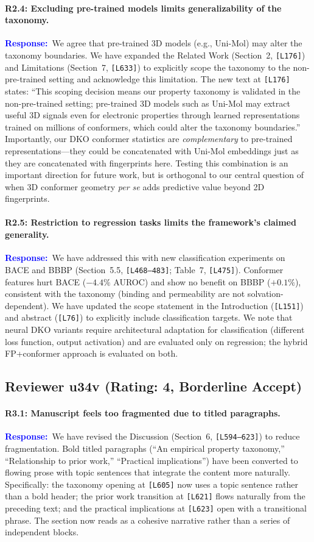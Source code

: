 \documentclass[11pt]{article}
\newcommand{\reviewer}[1]{\subsection*{#1}}
\newcommand{\point}[1]{\paragraph{#1}}
\newcommand{\response}{\textcolor{blue}{\textbf{Response:}}~}
\newcommand{\lines}[1]{\texttt{[L#1]}}
\begin{document}
\point{R2.4: Excluding pre-trained models limits generalizability of the taxonomy.}

\response We agree that pre-trained 3D models (e.g., Uni-Mol) may alter the taxonomy boundaries. We have expanded the Related Work (Section~2, \lines{176}) and Limitations (Section~7, \lines{633}) to explicitly scope the taxonomy to the non-pre-trained setting and acknowledge this limitation. The new text at \lines{176} states: ``This scoping decision means our property taxonomy is validated in the non-pre-trained setting; pre-trained 3D models such as Uni-Mol may extract useful 3D signals even for electronic properties through learned representations trained on millions of conformers, which could alter the taxonomy boundaries.'' Importantly, our DKO conformer statistics are \emph{complementary} to pre-trained representations---they could be concatenated with Uni-Mol embeddings just as they are concatenated with fingerprints here. Testing this combination is an important direction for future work, but is orthogonal to our central question of when 3D conformer geometry \emph{per se} adds predictive value beyond 2D fingerprints.

\point{R2.5: Restriction to regression tasks limits the framework's claimed generality.}

\response We have addressed this with new classification experiments on BACE and BBBP (Section~5.5, \lines{468--483}; Table~7, \lines{475}). Conformer features hurt BACE ($-4.4\%$ AUROC) and show no benefit on BBBP ($+0.1\%$), consistent with the taxonomy (binding and permeability are not solvation-dependent). We have updated the scope statement in the Introduction (\lines{151}) and abstract (\lines{76}) to explicitly include classification targets. We note that neural DKO variants require architectural adaptation for classification (different loss function, output activation) and are evaluated only on regression; the hybrid FP+conformer approach is evaluated on both.

\reviewer{Reviewer u34v (Rating: 4, Borderline Accept)}

\point{R3.1: Manuscript feels too fragmented due to titled paragraphs.}

\response We have revised the Discussion (Section~6, \lines{594--623}) to reduce fragmentation. Bold titled paragraphs (``An empirical property taxonomy,'' ``Relationship to prior work,'' ``Practical implications'') have been converted to flowing prose with topic sentences that integrate the content more naturally. Specifically: the taxonomy opening at \lines{605} now uses a topic sentence rather than a bold header; the prior work transition at \lines{621} flows naturally from the preceding text; and the practical implications at \lines{623} open with a transitional phrase. The section now reads as a cohesive narrative rather than a series of independent blocks.
\end{document}
